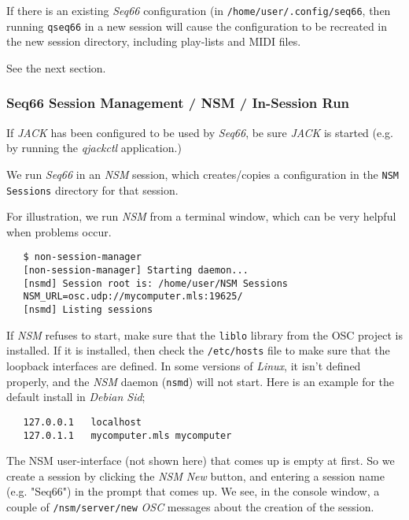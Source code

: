    If there is an existing \textsl{Seq66} configuration (in
   \texttt{/home/user/.config/seq66}, then running \texttt{qseq66} in a new
   session will cause the configuration to be recreated in the new session
   directory, including play-lists and MIDI files.

   See the next section.

\subsubsection{Seq66 Session Management / NSM / In-Session Run}
\label{subsec:sessions_nsm_in_session_run}


   If \textsl{JACK} has been configured to be
   used by \textsl{Seq66}, be sure \textsl{JACK} is started (e.g. by running
   the \textsl{qjackctl} application.)

   We run \textsl{Seq66} in an \textsl{NSM} session,
   which creates/copies a configuration in the \texttt{NSM Sessions} directory
   for that session.

   For illustration, we run \textsl{NSM} from a terminal window, which can be
   very helpful when problems occur.

\begin{verbatim}
   $ non-session-manager
   [non-session-manager] Starting daemon...
   [nsmd] Session root is: /home/user/NSM Sessions
   NSM_URL=osc.udp://mycomputer.mls:19625/
   [nsmd] Listing sessions
\end{verbatim}

   If \textsl{NSM} refuses to start, make sure that the \texttt{liblo} library
   from the OSC project is installed.  If it is installed, then check the
   \texttt{/etc/hosts} file to make sure that the loopback interfaces are
   defined. In some versions of \textsl{Linux}, it isn't defined properly,
   and the \textsl{NSM} daemon (\texttt{nsmd}) will not start.
   Here is an example for the default install in \textsl{Debian Sid};

\begin{verbatim}
   127.0.0.1   localhost
   127.0.1.1   mycomputer.mls mycomputer
\end{verbatim}

   The NSM user-interface (not shown here) that comes up is empty at first.  So
   we create a session by clicking the \textsl{NSM}
   \textsl{New} button, and entering a session name (e.g. "Seq66") in the
   prompt that comes up.  We see, in the console window, a couple of 
   \texttt{/nsm/server/new} \textsl{OSC} messages
   about the creation of the session.

